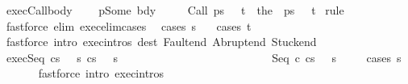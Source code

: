 \begin{isabellebody}
%
\endisadelimproof
\isanewline
\isanewline
{}\isamarkupfalse%
\ exec{\isacharunderscore}Call{\isacharunderscore}body{\isacharcolon}\ \isanewline
\ \ {\isachardoublequoteopen}{\isasymGamma}\ p{\isacharequal}Some\ bdy\ {\isasymLongrightarrow}\ \isanewline
\ \ \ {\isasymGamma}{\isasymturnstile}{\isasymlangle}Call\ p{\isacharcomma}s{\isasymrangle}\ {\isasymRightarrow}\ \ t\ {\isacharequal}\ {\isasymGamma}{\isasymturnstile}{\isasymlangle}the\ {\isacharparenleft}{\isasymGamma}\ p{\isacharparenright}{\isacharcomma}s{\isasymrangle}\ {\isasymRightarrow}\ \ t{\isachardoublequoteclose}\isanewline
%
\isadelimproof
%
\endisadelimproof
%
\isatagproof
{}\isamarkupfalse%
\ {\isacharparenleft}rule{\isacharparenright}\isanewline
{}\isamarkupfalse%
\ {\isacharparenleft}fastforce\ elim{\isacharcolon}\ exec{\isacharunderscore}elim{\isacharunderscore}cases\ {\isacharparenright}\isanewline
{}\isamarkupfalse%
\ {\isacharparenleft}cases\ s{\isacharparenright}\isanewline
{}\isamarkupfalse%
\ \ \ {\isacharparenleft}cases\ t{\isacharparenright}\isanewline
{}\isamarkupfalse%
\ {\isacharparenleft}fastforce\ intro{\isacharcolon}\ exec{\isachardot}intros\ dest{\isacharcolon}\ Fault{\isacharunderscore}end\ Abrupt{\isacharunderscore}end\ Stuck{\isacharunderscore}end{\isacharparenright}{\isacharplus}\isanewline
{}\isamarkupfalse%
%
\endisatagproof
{\isafoldproof}%
%
\isadelimproof
\isanewline
%
\endisadelimproof
\isanewline
{}\isamarkupfalse%
\ exec{\isacharunderscore}Seq{\isacharprime}{\isacharcolon}\ {\isachardoublequoteopen}{\isasymlbrakk}{\isasymGamma}{\isasymturnstile}{\isasymlangle}c{}{\isacharcomma}s{\isasymrangle}\ {\isasymRightarrow}\ \ s{\isacharprime}{\isacharsemicolon}\ {\isasymGamma}{\isasymturnstile}{\isasymlangle}c{}{\isacharcomma}s{\isacharprime}{\isasymrangle}\ {\isasymRightarrow}\ \ s{\isacharprime}{\isacharprime}{\isasymrbrakk}\isanewline
\ \ \ \ \ \ \ \ \ \ \ \ \ {\isasymLongrightarrow}\isanewline
\ \ \ \ \ \ \ \ \ \ \ \ \ {\isasymGamma}{\isasymturnstile}{\isasymlangle}Seq\ c{}\ c{}{\isacharcomma}s{\isasymrangle}\ {\isasymRightarrow}\ \ s{\isacharprime}{\isacharprime}{\isachardoublequoteclose}\ \isanewline
%
\isadelimproof
\ \ %
\endisadelimproof
%
\isatagproof
{}\isamarkupfalse%
\ {\isacharparenleft}cases\ s{\isacharparenright}\isanewline
\ \ \isamarkupfalse%
\ \ \ \ {\isacharparenleft}fastforce\ intro{\isacharcolon}\ exec{\isachardot}intros{\isacharparenright}\isanewline

\end{isabellebody}
